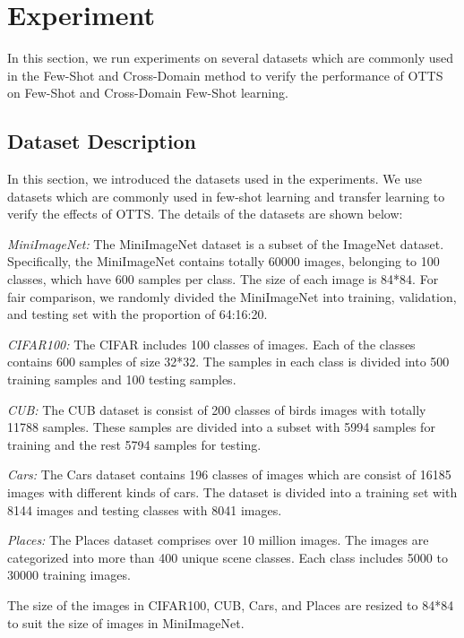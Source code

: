 \documentclass[10pt,journal,compsoc]{IEEEtran}
\begin{document}
\fi

\section{Experiment}
In this section, we run experiments on several datasets which are commonly used in the Few-Shot and Cross-Domain method \cite{Cross_domain,Cross_domain_2,CDFS_1,CDFS_2} to verify the performance of OTTS on Few-Shot and Cross-Domain Few-Shot learning. 

\subsection{Dataset Description}
In this section, we introduced the datasets used in the experiments. We use datasets which are commonly used in few-shot learning and transfer learning to verify the effects of OTTS. The details of the datasets are shown below:

\emph{MiniImageNet:}
The MiniImageNet \cite{meta_learning_MiniImageNet} dataset is a subset of the ImageNet dataset. Specifically, the MiniImageNet contains totally 60000 images, belonging to 100 classes, which have 600 samples per class. The size of each image is 84*84. For fair comparison, we randomly divided the MiniImageNet into training, validation, and testing set with the proportion of 64:16:20.

\emph{CIFAR100:}
The CIFAR \cite{CIFAR} includes 100 classes of images. Each of the classes contains 600 samples of size 32*32. The samples in each class is divided into 500 training samples and 100 testing samples.

\emph{CUB:}
The CUB \cite{CUB} dataset is consist of 200 classes of birds images with totally 11788 samples. These samples are divided into a subset with 5994 samples for training and the rest 5794 samples for testing.

\emph{Cars:}
The Cars \cite{Cars} dataset contains 196 classes of images which are consist of 16185 images with different kinds of cars. The dataset is divided into a training set with 8144 images and testing classes with 8041 images. 

\emph{Places:}
The Places \cite{places} dataset comprises over 10 million images. The images are categorized into more than 400 unique scene classes. Each class includes 5000 to 30000 training images.

The size of the images in CIFAR100, CUB, Cars, and Places are resized to 84*84 to suit the size of images in MiniImageNet. 
\end{document}
